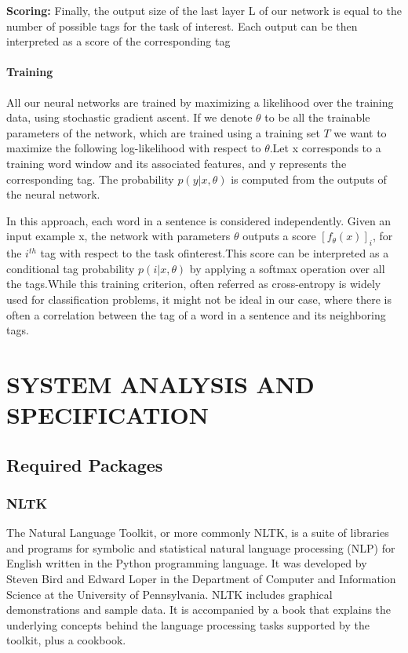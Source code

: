 \documentclass[12pt,a4paper,final]{extreport}
\begin{document}
\vspace{0.5cm}
\textbf{Scoring:} Finally, the output size of the last layer L of our network is equal to the number
of possible tags for the task of interest. Each output can be then interpreted as a score of the
corresponding tag
\subsubsection{Training}
All our neural networks are trained by maximizing a likelihood over the training data, using stochastic
gradient ascent. If we denote $\theta$ to be all the trainable parameters of the network, which are trained
using a training set $\textit{T}$ we want to maximize the following log-likelihood with respect to $\theta$.Let x corresponds to a training word window and its associated features, and
y represents the corresponding tag. The probability $p(y|x,\theta)$ is computed from the outputs of the neural
network.

In this approach, each word in a sentence is considered independently. Given an input example x, the network with parameters $\theta$ outputs a score $[f_{\theta}(x)]_{i}$, for the $i^{th}$ tag with respect to the task ofinterest.This score can be
interpreted as a conditional tag probability $p(i | x, \theta)$ by applying a softmax operation
over all the tags.While this training criterion, often referred as cross-entropy is widely used for classification problems,
it might not be ideal in our case, where there is often a correlation between the tag of a word
in a sentence and its neighboring tags.
\newpage
\chapter{SYSTEM ANALYSIS AND SPECIFICATION}

\section{Required Packages}
\subsection{NLTK}
The Natural Language Toolkit, or more commonly NLTK, is a suite of libraries and programs for symbolic and statistical natural language processing (NLP) for English written in the Python programming language. It was developed by Steven Bird and Edward Loper in the Department of Computer and Information Science at the University of Pennsylvania. NLTK includes graphical demonstrations and sample data. It is accompanied by a book that explains the underlying concepts behind the language processing tasks supported by the toolkit, plus a cookbook.
\end{document}
